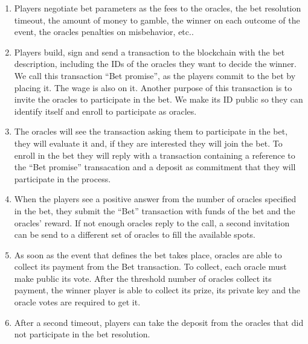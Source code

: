 \begin{enumerate}
  \item Players negotiate bet parameters as the fees to the oracles, the bet
      resolution timeout, the amount of money to gamble, the winner on each
      outcome of the event, the oracles penalties on misbehavior, etc..
  \item Players build, sign and send a transaction to the blockchain with the
      bet description, including the IDs of the oracles they want to decide the
      winner.
    We call this transaction ``Bet promise'', as the players commit to the bet
      by placing it. The wage is also on it.
    Another purpose of this transaction is to invite the oracles to
      participate in the bet.
      We make its ID public so they can identify itself
      and enroll to participate as oracles.
  \item The oracles will see the transaction asking them to participate in the
      bet, they will evaluate it and, if they are interested they will join the
      bet.
    To enroll in the bet they will reply with a transaction containing a
      reference to the ``Bet promise'' transacation and a deposit as commitment
      that they will participate in the process.
  \item When the players see a positive answer from the number of oracles
      specified in the bet, they submit the ``Bet'' transaction with funds of
      the bet and the oracles' reward.
  	If not enough oracles reply to the call, a second invitation can be send to
  	  a different set of oracles to fill the available spots.
  \item As soon as the event that defines the bet  takes place, oracles are able
      to collect its payment from the Bet transaction.
      To collect, each oracle must make public its vote.
  	After the threshold number of oracles collect its payment, the winner player
  	  is able to collect its prize, its private key and the oracle votes are
  	  required to get it.
  \item After a second timeout, players can take the deposit from the oracles
  	  that did not participate in the bet resolution.
\end{enumerate}

